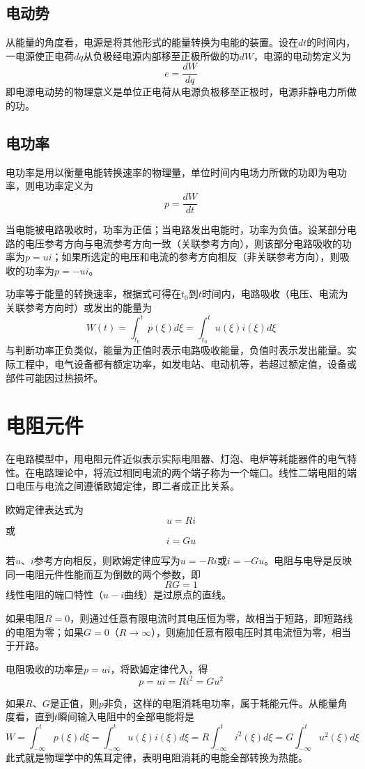 \subsection{电动势}
从能量的角度看，电源是将其他形式的能量转换为电能的装置。设在$dt$的时间内，一电源使正电荷$dq$从负极经电源内部移至正极所做的功$dW$，电源的电动势定义为
\[
e=\frac{dW}{dq}
\]
即电源电动势的物理意义是单位正电荷从电源负极移至正极时，电源非静电力所做的功。

\subsection{电功率}
电功率是用以衡量电能转换速率的物理量，单位时间内电场力所做的功即为电功率，则电功率定义为
\[
p=\frac{dW}{dt}
\]

当电能被电路吸收时，功率为正值；当电路发出电能时，功率为负值。设某部分电路的电压参考方向与电流参考方向一致（关联参考方向），则该部分电路吸收的功率为$p=ui$；如果所选定的电压和电流的参考方向相反（非关联参考方向），则吸收的功率为$p=-ui$。

功率等于能量的转换速率，根据式可得在$t_0$到$t$时间内，电路吸收（电压、电流为关联参考方向时）或发出的能量为
\[
W(t)=\int_{t_0}^tp(\xi)d\xi=\int_{t_0}^tu(\xi)i(\xi)d\xi
\]
与判断功率正负类似，能量为正值时表示电路吸收能量，负值时表示发出能量。实际工程中，电气设备都有额定功率，如发电站、电动机等，若超过额定值，设备或部件可能因过热损坏。

\section{电阻元件}
在电路模型中，用电阻元件近似表示实际电阻器、灯泡、电炉等耗能器件的电气特性。在电路理论中，将流过相同电流的两个端子称为一个端口。线性二端电阻的端口电压与电流之间遵循欧姆定律，即二者成正比关系。

欧姆定律表达式为
\[
u=Ri
\]
或
\[
i=Gu
\]

若$u\text{、}i$参考方向相反，则欧姆定律应写为$u=-Ri$或$i=-Gu$。电阻与电导是反映同一电阻元件性能而互为倒数的两个参数，即
\[
RG=1
\]
线性电阻的端口特性（$u-i$曲线）是过原点的直线。

如果电阻$R=0$，则通过任意有限电流时其电压恒为零，故相当于短路，即短路线的电阻为零；如果$G=0$（$R\rightarrow\infty$），则施加任意有限电压时其电流恒为零，相当于开路。

电阻吸收的功率是$p=ui$，将欧姆定律代入，得
\[
p=ui=Ri^2=Gu^2
\]

如果$R\text{、}G$是正值，则$p$非负，这样的电阻消耗电功率，属于耗能元件。从能量角度看，直到$t$瞬间输入电阻中的全部电能将是
\[
W=\int_{-∞}^tp(\xi)d\xi=\int_{-∞}^tu(\xi)i(\xi)d\xi=R\int_{-∞}^ti^2(\xi)d\xi=G\int_{-∞}^tu^2(\xi)d\xi
\]
此式就是物理学中的焦耳定律，表明电阻消耗的电能全部转换为热能。

